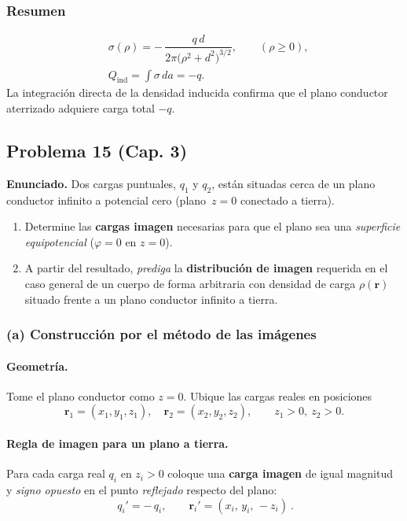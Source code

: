 \documentclass{article}
\begin{document}
\subsubsection*{Resumen}
\[
\boxed{
\begin{aligned}
&\sigma(\rho)=-\,\dfrac{q\,d}{2\pi\big(\rho^2+d^2\big)^{3/2}},\qquad (\rho\ge 0),\\[6pt]
&Q_{\text{ind}}=\displaystyle\int\sigma\,da=-q.
\end{aligned}}
\]
La integración directa de la densidad inducida confirma que el plano conductor aterrizado adquiere carga total $-q$.


\subsection{Problema 15 (Cap. 3)} \vspace{0.5cm}

\textbf{Enunciado.} Dos cargas puntuales, $q_{1}$ y $q_{2}$, están situadas cerca de un plano conductor infinito a potencial cero (plano \,$z=0$ conectado a tierra). 
\begin{enumerate}[label=(\alph*)]
\item Determine las \textbf{cargas imagen} necesarias para que el plano sea una \emph{superficie equipotencial} ($\varphi=0$ en $z=0$).
\item A partir del resultado, \emph{prediga} la \textbf{distribución de imagen} requerida en el caso general de un cuerpo de forma arbitraria con densidad de carga $\rho(\mathbf r)$ situado frente a un plano conductor infinito a tierra.
\end{enumerate}

\subsubsection*{(a) Construcción por el método de las imágenes}
\paragraph{Geometría.} Tome el plano conductor como $z=0$. Ubique las cargas reales en posiciones
\[
\mathbf r_{1}=(x_{1},y_{1},z_{1}),\quad \mathbf r_{2}=(x_{2},y_{2},z_{2}),\qquad z_{1}>0,\ z_{2}>0.
\]
\paragraph{Regla de imagen para un plano a tierra.}
Para cada carga real $q_i$ en $z_i>0$ coloque una \textbf{carga imagen} de igual magnitud y \emph{signo opuesto} en el punto \emph{reflejado} respecto del plano:
\[
\boxed{\ \ q_i'=-\,q_i,\qquad \mathbf r_i'=(x_i,\,y_i,\,-z_i)\ .\ }
\]
\end{document}
